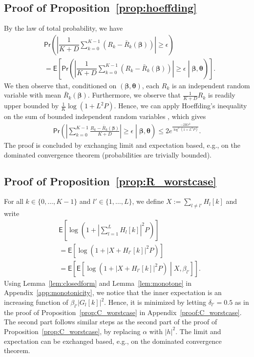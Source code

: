 \documentclass[10pt,journal,a4paper]{IEEEtran}
\newcommand{\eqdef}{:=}
\newcommand{\E}{\mathsf{E}}		%
\renewcommand{\P}{\mathsf{Pr}} 			%
\renewcommand{\vec}[1]{\bm{#1}}		%
\begin{document}
\subsection{Proof of Proposition~\ref{prop:hoeffding}}
\label{proof:hoeffding}
By the law of total probability, we have
\begin{align*}
&\P\left(\left|\dfrac{1}{K+D}\sum_{k=0}^{K-1}\left(R_k-\bar{R}_k(\vec{\beta})\right) \right|\geq \epsilon\right)\\
&=\E\left[\P\left(\left|\dfrac{1}{K+D}\sum_{k=0}^{K-1}\left(R_k-\bar{R}_k(\vec{\beta})\right) \right|\geq \epsilon \middle| \vec{\beta},\vec{\theta}\right) \right].
\end{align*}
We then observe that, conditioned on $(\vec{\beta},\vec{\theta})$, each $R_k$ is an independent random variable with mean $\bar{R}_k(\vec{\beta})$. Furthermore, we observe that $\frac{1}{K+D}R_k$ is readily upper bounded by $\frac{1}{K}\log(1+L^2P)$. Hence, we can apply Hoeffding's inequality on the sum of bounded independent random variables \cite{hoeffding1963}, which gives
\begin{align*}
\P\left(\left|\sum_{k=0}^{K-1}\frac{R_k-\bar{R}_k(\vec{\beta})}{K+D}\right|\geq \epsilon \middle| \vec{\beta},\vec{\theta}\right)\leq 2 e^{\frac{-2K\epsilon^2}{\log^2(1+L^2P)}}.
\end{align*}
The proof is concluded by exchanging limit and expectation based, e.g., on the dominated convergence theorem (probabilities are trivially bounded). 

\subsection{Proof of Proposition~\ref{prop:R_worstcase}}
\label{proof:R_worstcase}
For all $k\in \{0,\ldots,K-1\}$ and $l'\in \{1,\ldots,L\}$, we define $X \eqdef \sum_{l\neq l'} H_l[k]$ and write
\begin{align*}
&\E\left[\log\left(1+\left|\textstyle \sum_{l=1}^LH_l[k]\right|^2P\right)\right] \\
&= \E\left[\log\left(1+\left|X+H_{l'}[k]\right|^2P\right)\right] \\
&= \E\left[\E\left[\log\left(1+\left|X+H_{l'}[k]\right|^2P\right)\middle|X,\beta_{l'}\right]\right].
\end{align*}
Using Lemma~\ref{lem:closedform} and Lemma~\ref{lem:monotone} in Appendix~\ref{app:monotonicity}, we notice that the inner expectation is an increasing function of $\beta_{l'}|G_l[k]|^2$. Hence, it is minimized by letting $\delta_{l'}=0.5$ as in the proof of Proposition~\ref{prop:C_worstcase} in Appendix~\ref{proof:C_worstcase}. The second part follows similar steps as the second part of the proof of Proposition~\ref{prop:C_worstcase}, by replacing $\alpha$ with $|h|^2$. The limit and expectation can be exchanged based, e.g., on the dominated convergence theorem.
\end{document}

